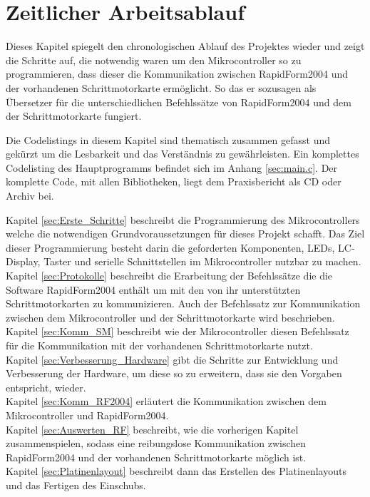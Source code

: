 \chapter{Zeitlicher Arbeitsablauf}
\label{cha:Arbeit}
Dieses Kapitel spiegelt den chronologischen Ablauf des Projektes wieder und zeigt die Schritte auf, die notwendig waren um den Mikrocontroller so zu programmieren, dass dieser die Kommunikation zwischen RapidForm2004 und der vorhandenen Schrittmotorkarte ermöglicht. So das er sozusagen als Übersetzer für die unterschiedlichen Befehlssätze von RapidForm2004 und dem der Schrittmotorkarte fungiert.
\begin{Tipp}Die Codelistings in diesem Kapitel sind thematisch zusammen gefasst und gekürzt um die Lesbarkeit und das Verständnis zu gewährleisten. Ein komplettes Codelisting des Hauptprogramms befindet sich im Anhang \ref{sec:main.c}. Der komplette Code, mit allen Bibliotheken, liegt dem Praxisbericht als CD oder Archiv bei.\end{Tipp}
Kapitel \ref{sec:Erste_Schritte} beschreibt die Programmierung des Mikrocontrollers welche die notwendigen Grundvoraussetzungen für dieses Projekt schafft. Das Ziel dieser Programmierung besteht darin die geforderten Komponenten, LEDs, LC-Display, Taster und serielle Schnittstellen im Mikrocontroller nutzbar zu machen.\\
Kapitel \ref{sec:Protokolle} beschreibt die Erarbeitung der Befehlssätze die die Software RapidForm2004 enthält um mit den von ihr unterstützten Schrittmotorkarten zu kommunizieren. Auch der Befehlssatz zur Kommunikation zwischen dem Mikrocontroller und der Schrittmotorkarte wird beschrieben.\\
Kapitel \ref{sec:Komm_SM} beschreibt wie der Mikrocontroller diesen Befehlssatz für die Kommunikation mit der vorhandenen Schrittmotorkarte nutzt.\\
Kapitel \ref{sec:Verbesserung_Hardware} gibt die Schritte zur Entwicklung und Verbesserung der Hardware, um diese so zu erweitern, dass sie den Vorgaben entspricht, wieder.\\
Kapitel \ref{sec:Komm_RF2004} erläutert die Kommunikation zwischen dem Mikrocontroller und RapidForm2004. \\
Kapitel \ref{sec:Auswerten_RF} beschreibt, wie die vorherigen Kapitel zusammenspielen, sodass eine reibungslose Kommunikation zwischen RapidForm2004 und der vorhandenen Schrittmotorkarte möglich ist.\\
Kapitel \ref{sec:Platinenlayout} beschreibt dann das Erstellen des Platinenlayouts und das Fertigen des Einschubs.

